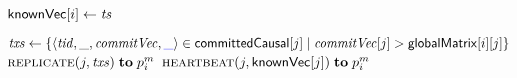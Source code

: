 \begin{algorithm*}[t]
\begin{algorithmic}[1]
      \hStatex
      \State ${\sf knownVec}[i] \gets \mathit{ts}$
        \label{line:heartbeat-knownvc}
    \EndWhenRcv

    \Statex
      \label{line:function-forward}
      \State \var $\mathit{txs} \gets \{\langle \mathit{tid}, \_, \mathit{commitVec}, \textcolor{blue}{\_} \rangle
        \in {\sf committedCausal}[j] \mid \mathit{commitVec}[j] > {\sf globalMatrix}[i][j]\}$
        \label{line:forward-txs}
      \If{$\txsvar \neq \emptyset$}
        \label{line:forward-txs-nonempty}
        \State \send $\textsc{replicate}(j, \mathit{txs}) \;{\bf to}\; p^m_i$
          \label{line:forward-call-replicate}
      \Else
        \State \send $\textsc{heartbeat}(j, {\sf knownVec}[j]) \;{\bf to}\; p^m_i$
          \label{line:forward-call-heartbeat}
      \EndIf
    \EndFunction
  \end{algorithmic}
\end{algorithm*}